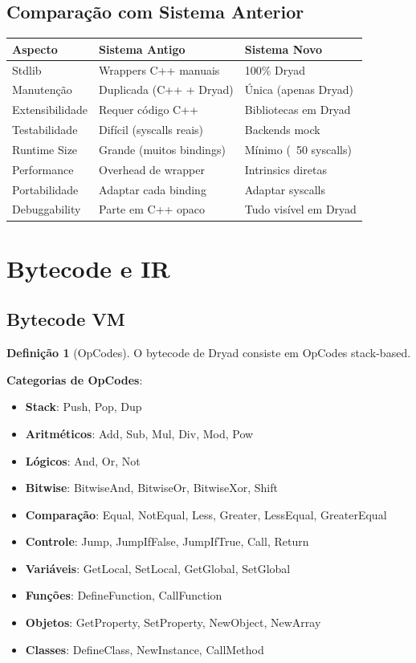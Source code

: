 \documentclass[12pt,a4paper]{article}
\theoremstyle{definition}
\newtheorem{definition}{Definição}[section]
\begin{document}
\subsection{Comparação com Sistema Anterior}

\begin{center}
\begin{tabular}{|l|p{5cm}|p{5cm}|}
\hline
\textbf{Aspecto} & \textbf{Sistema Antigo} & \textbf{Sistema Novo} \\
\hline
Stdlib & Wrappers C++ manuais & 100\% Dryad \\
\hline
Manutenção & Duplicada (C++ + Dryad) & Única (apenas Dryad) \\
\hline
Extensibilidade & Requer código C++ & Bibliotecas em Dryad \\
\hline
Testabilidade & Difícil (syscalls reais) & Backends mock \\
\hline
Runtime Size & Grande (muitos bindings) & Mínimo (~50 syscalls) \\
\hline
Performance & Overhead de wrapper & Intrinsics diretas \\
\hline
Portabilidade & Adaptar cada binding & Adaptar syscalls \\
\hline
Debuggability & Parte em C++ opaco & Tudo visível em Dryad \\
\hline
\end{tabular}
\end{center}

\section{Bytecode e IR}

\subsection{Bytecode VM}

\begin{definition}[OpCodes]
O bytecode de Dryad consiste em OpCodes stack-based.

\textbf{Categorias de OpCodes}:
\begin{itemize}
    \item \textbf{Stack}: Push, Pop, Dup
    \item \textbf{Aritméticos}: Add, Sub, Mul, Div, Mod, Pow
    \item \textbf{Lógicos}: And, Or, Not
    \item \textbf{Bitwise}: BitwiseAnd, BitwiseOr, BitwiseXor, Shift
    \item \textbf{Comparação}: Equal, NotEqual, Less, Greater, LessEqual, GreaterEqual
    \item \textbf{Controle}: Jump, JumpIfFalse, JumpIfTrue, Call, Return
    \item \textbf{Variáveis}: GetLocal, SetLocal, GetGlobal, SetGlobal
    \item \textbf{Funções}: DefineFunction, CallFunction
    \item \textbf{Objetos}: GetProperty, SetProperty, NewObject, NewArray
    \item \textbf{Classes}: DefineClass, NewInstance, CallMethod
\end{itemize}
\end{definition}
\end{document}
